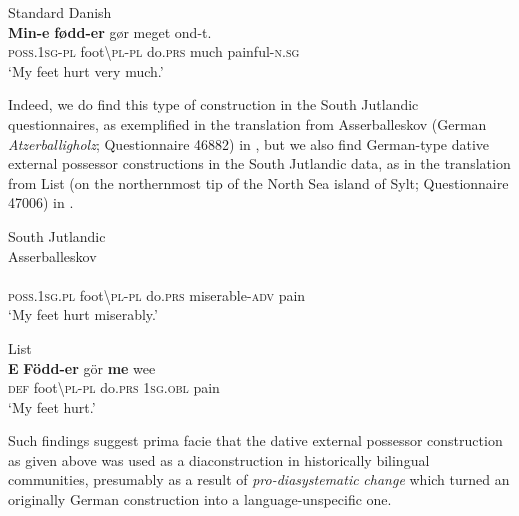 \documentclass[output=paper]{langsci/langscibook}
\begin{document}
\ea\label{ex:hoeder:23}
	Standard Danish\\
	\gll \textbf{Min-e} \textbf{fødd-er} gør meget ond-t.\\
     \textsc{poss.1sg-pl} foot{\textbackslash}\textsc{pl-pl} do.\textsc{prs} much painful-\textsc{n.sg}\\
	\glt `My feet hurt very much.'
\z

Indeed, we do find this type of construction in the South Jutlandic questionnaires, as exemplified in the translation from Asserballeskov (German \textit{Atzerballigholz}; Questionnaire 46882) in , but we also find German-type dative external possessor constructions in the South Jutlandic data, as in the translation from List (on the northernmost tip of the North Sea island of Sylt; Questionnaire 47006) in .

\ea\label{ex:hoeder:24}
	South Jutlandic\\
	\ea\label{ex:hoeder:24a}
	Asserballeskov\\
	\\
     \textsc{poss.1sg.pl} foot{\textbackslash}\textsc{pl-pl} do.\textsc{prs} miserable-\textsc{adv} pain\\
	\glt `My feet hurt{} miserably.'

	\ex\label{ex:hoeder:24b}
	List\\
	\gll \textbf{E} \textbf{Född-er} gör \textbf{me} wee\\
     \textsc{def} foot{\textbackslash}\textsc{pl-pl} do.\textsc{prs} \textsc{1sg.obl} pain\\
	\glt `My feet hurt.'
	\z
\z

Such findings suggest prima facie that the dative external possessor construction as given above was used as a diaconstruction in historically bilingual communities, presumably as a result of \textit{pro-diasystematic} \textit{change} which turned an originally German construction into a language-unspecific one.
\end{document}
